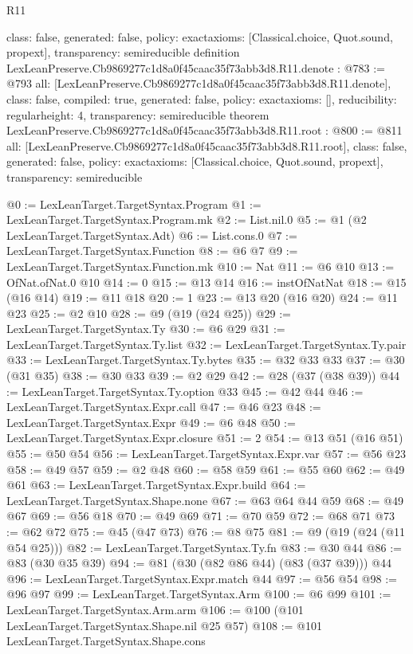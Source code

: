 \begin{lexlean}{R11}
\begin{coremodule}
{  class: false,
  generated: false,
  policy: exact{axioms: [Classical.choice, Quot.sound, propext]},
  transparency: semireducible
}
definition LexLeanPreserve.Cb9869277c1d8a0f45caac35f73abb3d8.R11.denote : @783 := @793 {
  all: [LexLeanPreserve.Cb9869277c1d8a0f45caac35f73abb3d8.R11.denote],
  class: false,
  compiled: true,
  generated: false,
  policy: exact{axioms: []},
  reducibility: regular{height: 4},
  transparency: semireducible
}
theorem LexLeanPreserve.Cb9869277c1d8a0f45caac35f73abb3d8.R11.root : @800 := @811 {
  all: [LexLeanPreserve.Cb9869277c1d8a0f45caac35f73abb3d8.R11.root],
  class: false,
  generated: false,
  policy: exact{axioms: [Classical.choice, Quot.sound, propext]},
  transparency: semireducible
}

@0 := LexLeanTarget.TargetSyntax.Program
@1 := LexLeanTarget.TargetSyntax.Program.mk
@2 := List.nil.{0}
@5 := @1 (@2 LexLeanTarget.TargetSyntax.Adt)
@6 := List.cons.{0}
@7 := LexLeanTarget.TargetSyntax.Function
@8 := @6 @7
@9 := LexLeanTarget.TargetSyntax.Function.mk
@10 := Nat
@11 := @6 @10
@13 := OfNat.ofNat.{0} @10
@14 := 0
@15 := @13 @14
@16 := instOfNatNat
@18 := @15 (@16 @14)
@19 := @11 @18
@20 := 1
@23 := @13 @20 (@16 @20)
@24 := @11 @23
@25 := @2 @10
@28 := @9 (@19 (@24 @25))
@29 := LexLeanTarget.TargetSyntax.Ty
@30 := @6 @29
@31 := LexLeanTarget.TargetSyntax.Ty.list
@32 := LexLeanTarget.TargetSyntax.Ty.pair
@33 := LexLeanTarget.TargetSyntax.Ty.bytes
@35 := @32 @33 @33
@37 := @30 (@31 @35)
@38 := @30 @33
@39 := @2 @29
@42 := @28 (@37 (@38 @39))
@44 := LexLeanTarget.TargetSyntax.Ty.option @33
@45 := @42 @44
@46 := LexLeanTarget.TargetSyntax.Expr.call
@47 := @46 @23
@48 := LexLeanTarget.TargetSyntax.Expr
@49 := @6 @48
@50 := LexLeanTarget.TargetSyntax.Expr.closure
@51 := 2
@54 := @13 @51 (@16 @51)
@55 := @50 @54
@56 := LexLeanTarget.TargetSyntax.Expr.var
@57 := @56 @23
@58 := @49 @57
@59 := @2 @48
@60 := @58 @59
@61 := @55 @60
@62 := @49 @61
@63 := LexLeanTarget.TargetSyntax.Expr.build
@64 := LexLeanTarget.TargetSyntax.Shape.none
@67 := @63 @64 @44 @59
@68 := @49 @67
@69 := @56 @18
@70 := @49 @69
@71 := @70 @59
@72 := @68 @71
@73 := @62 @72
@75 := @45 (@47 @73)
@76 := @8 @75
@81 := @9 (@19 (@24 (@11 @54 @25)))
@82 := LexLeanTarget.TargetSyntax.Ty.fn
@83 := @30 @44
@86 := @83 (@30 @35 @39)
@94 := @81 (@30 (@82 @86 @44) (@83 (@37 @39))) @44
@96 := LexLeanTarget.TargetSyntax.Expr.match @44
@97 := @56 @54
@98 := @96 @97
@99 := LexLeanTarget.TargetSyntax.Arm
@100 := @6 @99
@101 := LexLeanTarget.TargetSyntax.Arm.arm
@106 := @100 (@101 LexLeanTarget.TargetSyntax.Shape.nil @25 @57)
@108 := @101 LexLeanTarget.TargetSyntax.Shape.cons

\end{coremodule}
\end{lexlean}
